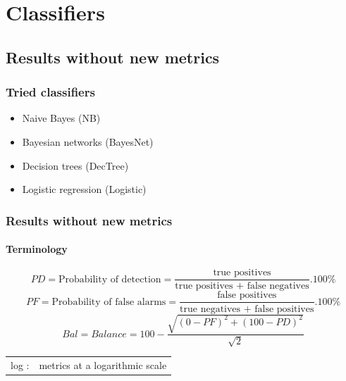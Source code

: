 \documentclass{beamer}
\begin{document}
\section{Classifiers}
\subsection{Results without new metrics}
\begin{frame}
 \frametitle{Tried classifiers} %
 \begin{itemize}
  \item Naive Bayes (NB)
  \item Bayesian networks (BayesNet)
  \item Decision trees (DecTree)
  \item Logistic regression (Logistic)
 \end{itemize}
\end{frame}

\begin{frame}
 \frametitle{Results without new metrics}
 \framesubtitle{Terminology}
 $$PD = \text{Probability of detection} = \frac{\text{true positives}}{\text{true positives + false negatives}} . 100\%$$
 \vspace{0.3cm}
 $$PF = \text{Probability of false alarms} = \frac{\text{false positives}}{\text{true negatives + false positives}} . 100\%$$
 \vspace{0.3cm}
 $$Bal = Balance = 100 - \frac{\sqrt{(0-PF)^2 + (100-PD)^2}}{\sqrt{2}}$$
 \begin{center}
  \begin{tabular}{ll}
   log : & metrics at a logarithmic scale
  \end{tabular}
 \end{center}
\end{frame}
\end{document}
